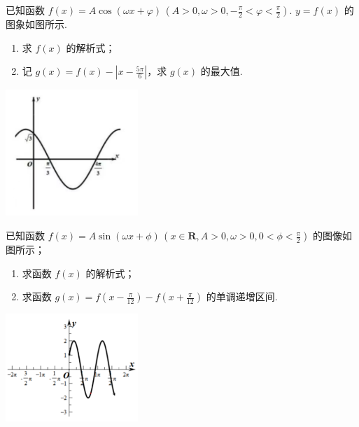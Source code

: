 \documentclass[a4paper , final]{ctexart}
\newenvironment{problemwithfig}[3][2cm]{%
  \item #2
  \par\noindent
  \begin{minipage}[t][8cm][b]{\linewidth}
    \vfill
    \hfill #3
    \par\vspace{#1} %
  \end{minipage}
}{}
\begin{document}
\begin{problems}
\begin{problemwithfig}[5cm]
  {
    已知函数 $f(x) = A\cos(\omega x + \varphi)\,(A > 0, \omega > 0, -\frac{\pi}{2} < \varphi < \frac{\pi}{2})$. $y = f(x)$ 的图象如图所示.
    \begin{enumerate}[label=(\arabic*)]
      \item 求 $f(x)$ 的解析式；
      \item 记 $g(x) = f(x) - \left|x - \frac{5\pi}{6}\right|$，求 $g(x)$ 的最大值.
    \end{enumerate}
  }
  {
    \includegraphics[width=5cm]{Snipaste_2025-07-22_23-32-36.png}
  }
\end{problemwithfig}

\begin{problemwithfig}[5cm]
  {
    已知函数 $f(x) = A\sin(\omega x + \phi)\,(x \in \mathbf{R}, A > 0, \omega > 0, 0 < \phi < \frac{\pi}{2})$ 的图像如图所示；
    \begin{enumerate}[label=(\arabic*)]
      \item 求函数 $f(x)$ 的解析式；
      \item 求函数 $g(x) = f\left(x - \frac{\pi}{12}\right) - f\left(x + \frac{\pi}{12}\right)$ 的单调递增区间.
    \end{enumerate}
  }
  {
    \includegraphics[width=5cm]{Snipaste_2025-07-22_23-35-46.png}
  }
\end{problemwithfig}


\end{problems}
\end{document}
